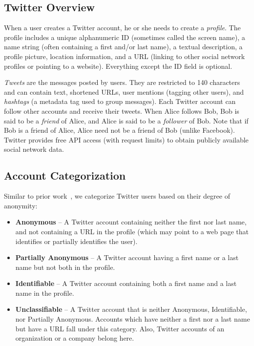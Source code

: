 \documentclass[conference]{IEEEtran}
\begin{document}
\subsection{Twitter Overview} 
When a user creates a Twitter account, he or she needs to create a \textit{profile}. The profile includes a unique alphanumeric ID (sometimes called the screen name), a name string (often containing a first and/or last name), a textual description, a profile picture, location information, and a URL (linking to other social network profiles or pointing to a website). Everything except the ID field is optional.

\textit{Tweets} are the messages posted by users. They are restricted to 140 characters and can contain text, shortened URLs, user mentions (tagging other users), and \textit{hashtags} (a metadata tag used to group messages). Each Twitter account can follow other accounts and receive their tweets. When Alice follows Bob, Bob is said to be a {\em friend} of Alice, and Alice is said to be a {\em follower} of Bob. Note that if Bob is a friend of Alice, Alice need not be a friend of Bob (unlike Facebook). Twitter provides free API access (with request limits) to obtain publicly available social network data.

\subsection{Account Categorization}
\label{sec:userclassification}
Similar to prior work~\cite{PeddintiCOSN2014}, we categorize Twitter users based on their degree of anonymity:
\begin{itemize}
\item \textbf{Anonymous} -- A Twitter account containing neither the first nor last name, and not containing a URL in the profile (which may point to a web page that identifies or partially identifies the user). 
\item \textbf{Partially Anonymous} -- A Twitter account having a first name or a last name but not both in the profile.
\item \textbf{Identifiable} -- A Twitter account containing both a first name and a last name in the profile.  
\item \textbf{Unclassifiable} -- A Twitter account that is neither Anonymous, Identifiable, nor Partially Anonymous. Accounts which have neither a first nor a last name but have a URL fall under this category. Also, Twitter accounts of an organization or a company belong here.

\end{itemize}
\end{document}
